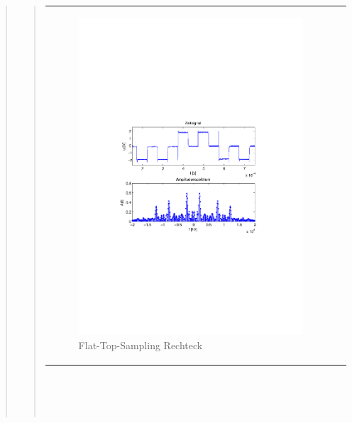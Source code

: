 \begin{quote}
\begin{quote}
\begin{center}
\begin{tabular}{ll}
                \begin{minipage}{0.6\textwidth}
                    \begin{figure}[H]
                        \includegraphics[scale=0.55, trim = 16mm 70mm 16mm 85mm, clip]{Bilder/flatskizze}
                       \caption{Flat-Top-Sampling Rechteck}
                      \label{fig:flatrec}
                    \end{figure}
                \end{minipage}
            
            \end{tabular}
            \end{center}
            \ \\
            \ \\
            \ \\
            

\end{quote}
\end{quote}
